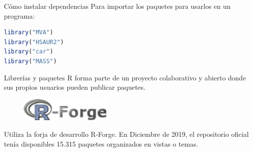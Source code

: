 \documentclass[xcolor=table]{beamer}
\begin{document}
\begin{frame}[fragile]{Cómo instalar dependencias}
Para importar los paquetes para usarlos en un programa:  
\begin{lstlisting}[language=R, basicstyle=\ttfamily]
library("MVA")
library("HSAUR2")
library("car")
library("MASS")
\end{lstlisting}

\end{frame}

\begin{frame}{Librerías y paquetes}
R forma parte de un proyecto colaborativo y abierto donde sus propios usuarios pueden publicar paquetes.
\newline
\newline
\begin{figure}
\centering
\includegraphics[width=0.4\textwidth]{r-forge.png}
\end{figure}
{Utiliza la forja de desarrollo R-Forge.}
\newline
\newline
{En Diciembre de 2019, el repositorio oficial tenía disponibles 15.315 paquetes organizados en vistas o temas. }
\end{frame}
\end{document}
